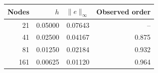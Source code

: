 \begin{tabular}{rrrr}
\toprule
Nodes & $h$ & $\|e\|_\infty$ & Observed order \\
\midrule
21 & 0.05000 & 0.07643 & -- \\
41 & 0.02500 & 0.04167 & 0.875 \\
81 & 0.01250 & 0.02184 & 0.932 \\
161 & 0.00625 & 0.01120 & 0.964 \\
\bottomrule
\end{tabular}
